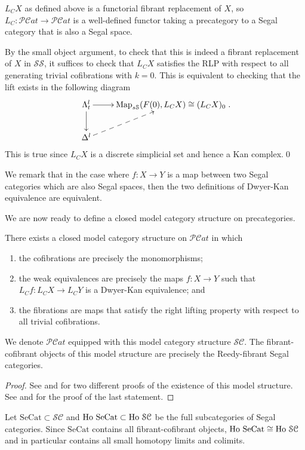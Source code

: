 \begin{refsection}
\begin{prop}
$L_CX$ as defined above is a functorial fibrant replacement of $X$, so $L_C:\mathcal{PC}at\to\mathcal{PC}at$ is a well-defined functor taking a precategory to a Segal category that is also a Segal space.
\end{prop}

By the small object argument, to check that this is indeed a fibrant replacement of $X$ in $\mathcal{SS}$, it suffices to check that $L_CX$ satisfies the RLP with respect to all generating trivial cofibrations with $k=0$. This is equivalent to checking that the lift exists in the following diagram
$$\xymatrix{\Lambda^l_t\ar[r]\ar[d]&\Map_{s\mathcal S}(F(0),L_CX)\cong (L_CX)_0\\\Delta^l\ar@{-->}[ur]}.$$
This is true since $L_CX$ is a discrete simplicial set and hence a Kan complex.\qed

We remark that in the case where $f:X\to Y$ is a map between two Segal categories which are also Segal spaces, then the two definitions of Dwyer-Kan equivalence are equivalent.

We are now ready to define a closed model category structure on precategories.

\begin{thm}
There exists a closed model category structure on $\mathcal{PC}at$ in which
\begin{enumerate}
\item the cofibrations are precisely the monomorphisms;
\item the weak equivalences are precisely the maps $f:X\to Y$ such that $L_Cf:L_CX\to L_CY$ is a Dwyer-Kan equivalence; and
\item the fibrations are maps that satisfy the right lifting property with respect to all trivial cofibrations.
\end{enumerate}
We denote $\mathcal{PC}at$ equipped with this model category structure $\mathcal{SC}$. The fibrant-cofibrant objects of this model structure are precisely the Reedy-fibrant Segal categories.
\end{thm}
\begin{proof}
See \cite[Thm 2.3]{hs} and \cite[Thm 5.1]{bergner2} for two different proofs of the existence of this model structure. See \cite[Cor 5.13]{bergner2} and \cite[Thm 3.2]{bergner3} for the proof of the last statement.
\end{proof}

Let $\mathrm{SeCat}\subset\mathcal{SC}$ and $\operatorname{\mathrm{Ho} \,}\mathrm{SeCat}\subset\operatorname{\mathrm{Ho} \,}\mathcal{SC}$ be the full subcategories of Segal categories. Since $\mathrm{SeCat}$ contains all fibrant-cofibrant objects, $\operatorname{\mathrm{Ho} \,}\mathrm{SeCat}\cong\operatorname{\mathrm{Ho} \,}\mathcal{SC}$ and in particular contains all small homotopy limits and colimits.


\end{refsection}
